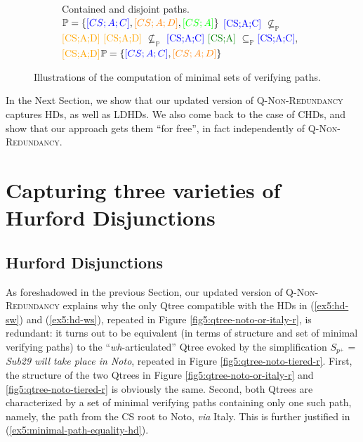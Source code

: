 \begin{figure}[H]
\begin{subfigure}[b]{.4\linewidth}
		\caption[]{Contained and disjoint paths.\newline$\mathbb{P} = \lbrace\textcolor{blue}{[CS;A;C]}, \textcolor{orange}{[CS;A;D]}, \textcolor{green}{[CS;A]}\rbrace$\newline
			\textcolor{blue}{[CS;A;C]}  $\not\subseteq_{\mathbb{P}}$  \textcolor{orange}{[CS;A;D]}\newline
			\textcolor{orange}{[CS;A;D]}  $\not\subseteq_{\mathbb{P}}$ 
			\textcolor{blue}{[CS;A;C]}
			\newline
			\textcolor{green}{[CS;A]} $\subseteq_{\mathbb{P}} $\textcolor{blue}{[CS;A;C]}, \textcolor{orange}{[CS;A;D]}\newline$\mathbb{P} = \lbrace\textcolor{blue}{[CS;A;C]}, \textcolor{orange}{[CS;A;D]}\rbrace$}\label{fig5:path-containment-mixed}
	\end{subfigure}
	\caption[]{Illustrations of the computation of minimal sets of verifying paths.}\label{fig5:path-containment}
\end{figure}


In the Next Section, we show that our updated version of \textsc{Q-Non-Redundancy} captures HDs, as well as LDHDs. We also come back to the case of CHDs, and show that our approach gets them ``for free'', in fact independently of \textsc{Q-Non-Redundancy}.

\section{Capturing three varieties of Hurford Disjunctions}\label{sec5:hd-account}

\subsection{Hurford Disjunctions}
As foreshadowed in the previous Section, our updated version of \textsc{Q-Non-Redundancy} explains why the only Qtree compatible with the HDs in (\ref{ex5:hd-sw}) and (\ref{ex5:hd-ws}), repeated in Figure \ref{fig5:qtree-noto-or-italy-r}, is redundant: it turns out to be equivalent (in terms of structure and set of minimal verifying paths) to the ``\textit{wh}-articulated'' Qtree evoked by the simplification $S_{p^+}$ = \textit{Sub29 will take place in Noto}, repeated in Figure \ref{fig5:qtree-noto-tiered-r}. First, the structure of the two Qtrees in Figure \ref{fig5:qtree-noto-or-italy-r} and \ref{fig5:qtree-noto-tiered-r} is obviously the same. Second, both Qtrees are characterized by a set of minimal verifying paths containing only one such path, namely, the path from the CS root to Noto, \textit{via} Italy. This is further justified in (\ref{ex5:minimal-path-equality-hd}).

